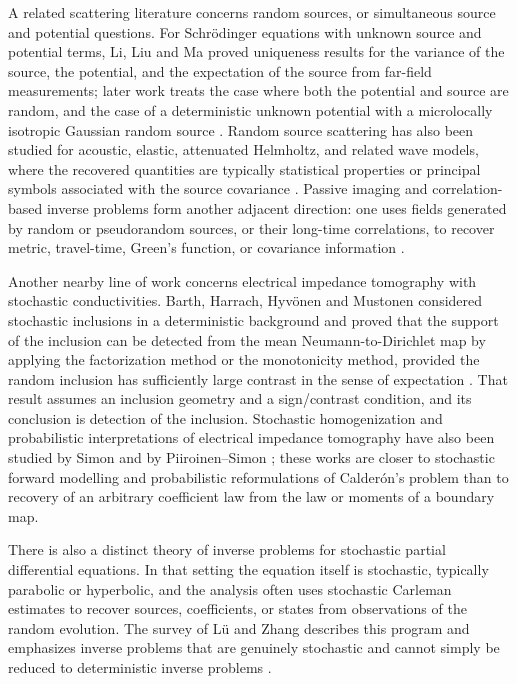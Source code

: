 \documentclass[11pt]{article}
\theoremstyle{plain}
\theoremstyle{definition}
\theoremstyle{remark}
\begin{document}
A related scattering literature concerns random sources, or simultaneous source and potential questions.  For Schr\"odinger equations with unknown source and potential terms, Li, Liu and Ma proved uniqueness results for the variance of the source, the potential, and the expectation of the source from far-field measurements; later work treats the case where both the potential and source are random, and the case of a deterministic unknown potential with a microlocally isotropic Gaussian random source \cite{LiLiuMa2019,LiLiuMa2021,LiuMa2023}.  Random source scattering has also been studied for acoustic, elastic, attenuated Helmholtz, and related wave models, where the recovered quantities are typically statistical properties or principal symbols associated with the source covariance \cite{BaoChenLi2016,LiChenLi2018,LiWang2021HelmholtzAttenuation,LiHelinLi2020,LiLi2019ElasticSource}.  Passive imaging and correlation-based inverse problems form another adjacent direction: one uses fields generated by random or pseudorandom sources, or their long-time correlations, to recover metric, travel-time, Green's function, or covariance information \cite{HelinLassasOksanen2012,HelinLassasOksanen2014,HelinLassasOksanenSaksala2018,DeHoopSolna2009,BardosGarnierPapanicolaou2008}.

Another nearby line of work concerns electrical impedance tomography with stochastic conductivities.  Barth, Harrach, Hyv\"onen and Mustonen considered stochastic inclusions in a deterministic background and proved that the support of the inclusion can be detected from the mean Neumann-to-Dirichlet map by applying the factorization method or the monotonicity method, provided the random inclusion has sufficiently large contrast in the sense of expectation \cite{BarthHarrachHyvonenMustonen2017}.  That result assumes an inclusion geometry and a sign/contrast condition, and its conclusion is detection of the inclusion.  Stochastic homogenization and probabilistic interpretations of electrical impedance tomography have also been studied by Simon and by Piiroinen--Simon \cite{Simon2015,PiiroinenSimon2016,PiiroinenSimon2017}; these works are closer to stochastic forward modelling and probabilistic reformulations of Calder\'on's problem than to recovery of an arbitrary coefficient law from the law or moments of a boundary map.

There is also a distinct theory of inverse problems for stochastic partial differential equations.  In that setting the equation itself is stochastic, typically parabolic or hyperbolic, and the analysis often uses stochastic Carleman estimates to recover sources, coefficients, or states from observations of the random evolution.  The survey of L\"u and Zhang describes this program and emphasizes inverse problems that are genuinely stochastic and cannot simply be reduced to deterministic inverse problems \cite{LuZhang2023}. 
\end{document}
